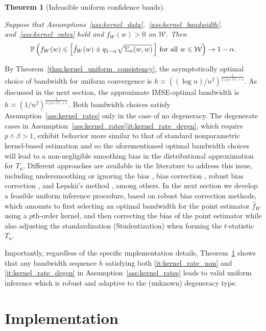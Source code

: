 \documentclass[11pt,lof]{puthesis}
\renewcommand{\P}{\ensuremath{\mathbb{P}}}
\newcommand{\cW}{\ensuremath{\mathcal{W}}}
\theoremstyle{break}
\newtheorem{theorem}{Theorem}[section]
\theoremstyle{proof}
\begin{document}
\begin{theorem}[Infeasible uniform confidence bands]
\label{thm:kernel_infeasible_ucb}

Suppose that Assumptions~\ref{ass:kernel_data},~\ref{ass:kernel_bandwidth},
and~\ref{ass:kernel_rates} hold and $f_W(w) > 0$ on $\cW$. Then
%
\begin{align*}
\P\left(
f_W(w) \in
\left[ \hat f_W(w) \pm q_{1-\alpha} \sqrt{\Sigma_n(w,w)} \, \right]
\, \textup{for all } w \in \cW
\right)
\to 1 - \alpha.
\end{align*}
%
\end{theorem}

By Theorem~\ref{thm:kernel_uniform_consistency}, the asymptotically optimal
choice of
bandwidth for uniform convergence is
$h \asymp ((\log n)/n^2)^{\frac{1}{2(p \wedge \beta)+1}}$.
As discussed in the next section, the approximate
IMSE-optimal bandwidth is $h \asymp (1/n^2)^{\frac{1}{2(p \wedge \beta)+1}}$.
Both bandwidth choices satisfy Assumption~\ref{ass:kernel_rates} only in the
case of
no degeneracy. The degenerate cases in
Assumption~\ref{ass:kernel_rates}\ref{it:kernel_rate_degen}, which require
$p \wedge \beta > 1$, exhibit behavior more similar to that of standard
nonparametric kernel-based estimation and so the aforementioned optimal
bandwidth choices will lead to a non-negligible smoothing bias in the
distributional approximation for $T_n$. Different approaches are available in
the literature to address this issue, including undersmoothing or ignoring the
bias \citep{hall2001bootstrapping}, bias correction \citep{hall1992effect},
robust bias correction \citep{calonico2018effect, calonico2022coverage}, and
Lepskii's method
\citep{lepskii1992asymptotically,birge2001alternative}, among others. In the
next section we develop a feasible uniform inference procedure, based on robust
bias correction methods, which amounts to first selecting an optimal bandwidth
for the point estimator $\hat{f}_W$ using a $p$th-order kernel, and then
correcting the bias of the point estimator while also adjusting the
standardization (Studentization) when forming the $t$-statistic $T_n$.

Importantly, regardless of the specific implementation details,
Theorem~\ref{thm:kernel_infeasible_ucb} shows that any bandwidth sequence $h$
satisfying both \ref{it:kernel_rate_non} and \ref{it:kernel_rate_degen}
in Assumption~\ref{ass:kernel_rates} leads to valid uniform inference which is
robust
and adaptive to the (unknown) degeneracy type.

\section{Implementation}
\label{sec:kernel_implementation}
\end{document}

